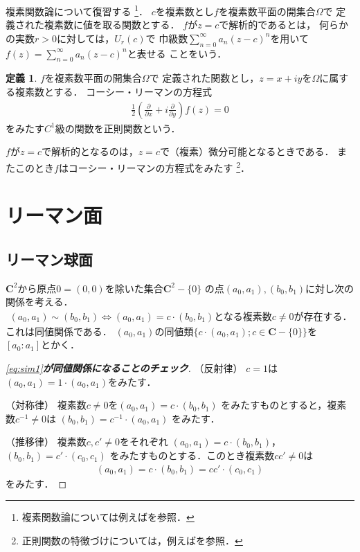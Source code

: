 \documentclass[11pt, a4paper, dvipdfmx, draft]{jsarticle}
\theoremstyle{definition}
\newtheorem{Definition}[Axiom]{定義}
\newcommand{\cc}{\mathbf{C}}
\newcommand{\p}{\partial}
\newcommand{\dip}{\displaystyle} %
\theoremstyle{mystyle}
\begin{document}
複素関数論について復習する
\footnote{複素関数論については例えば\cite{jimbo,yoshida,kaneko,fuji}を参照．}．
$c$を複素数とし$f$を複素数平面の開集合$\varOmega$で
定義された複素数に値を取る関数とする．
$f$が$z=c$で解析的であるとは，
何らかの実数$r>0$に対しては，$U_r(c)$で
巾級数$\dip \sum_{n=0}^{\infty}a_{n}(z-c)^{n}$を用いて
$\dip f(z)=\sum_{n=0}^{\infty}a_{n}(z-c)^{n}$と表せる
ことをいう．
\begin{Definition}
    $f$を複素数平面の開集合$\varOmega$で
    定義された関数とし，$z=x+iy$を$\varOmega$に属する複素数とする．
    コーシー・リーマンの方程式
    \begin{align}
        \frac{1}{2}\left(\frac{\p}{\p x}+i\frac{\p}{\p y}\right)f(z)=0
    \end{align}
    をみたす$C^1$級の関数を正則関数という．
\end{Definition}
$f$が$z=c$で解析的となるのは，$z=c$で（複素）微分可能となるときである．
またこのとき$f$はコーシー・リーマンの方程式をみたす
\footnote{正則関数の特徴づけについては，例えば\cite[4.3節]{kaneko}を参照．}．


\section{リーマン面}

\subsection{リーマン球面}

$\cc^{2}$から原点$0=(0,0)$を除いた集合$\cc^{2}-\{0\}$
の点$(a_{0},a_{1}), (b_{0},b_{1})$に対し次の関係を考える．
\begin{align}\label{eq:sim1}
    (a_{0},a_{1})\sim (b_{0},b_{1})
    \Longleftrightarrow
    (a_{0},a_{1})= c\cdot(b_{0},b_{1})
    \text{となる複素数}c\neq0\text{が存在する．}
\end{align}
これは同値関係である．
$(a_0,a_1)$の同値類$\{c\cdot(a_0,a_1); c\in\cc-\{0\}\}$を
$[a_0\colon a_1]$とかく．
\begin{proof}[\eqref{eq:sim1}\textbf{が同値関係になることのチェック}]
    
    （反射律）
    $c=1$は$(a_{0},a_{1})= 1\cdot(a_{0},a_{1})$をみたす．

    （対称律）
    複素数$c\neq0$を$(a_{0},a_{1})= c \cdot (b_{0},b_{1})$
    をみたすものとすると，複素数$c^{-1}\neq0$は
    $(b_{0},b_{1})=c^{-1} \cdot(a_{0},a_{1})$
    をみたす．

    （推移律）
    複素数$c,c'\neq0$をそれぞれ
    $(a_{0},a_{1})= c \cdot (b_{0},b_{1})$，
    $(b_{0},b_{1})= c' \cdot (c_{0},c_{1})$
    をみたすものとする．このとき複素数$cc'\neq0$は
    \begin{align*}
        (a_{0},a_{1})
        = c \cdot (b_{0},b_{1})
        =cc' \cdot (c_{0},c_{1})
    \end{align*}
    をみたす．
\end{proof}
\end{document}
